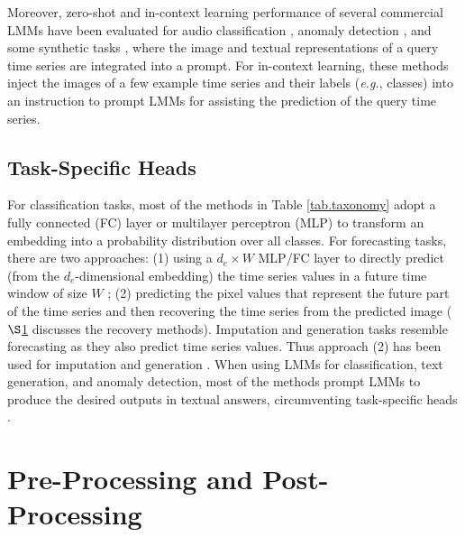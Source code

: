 Moreover, zero-shot and in-context learning performance of several commercial LMMs have been evaluated for audio classification \cite{dixit2024vision}, anomaly detection \cite{zhuang2024see}, and some synthetic tasks \cite{daswani2024plots}, where the image %
and textual representations of a query %
time series are integrated into a prompt. For in-context learning, these methods inject the images of a few example time series and their labels ({\em e.g.}, classes) %
into an instruction to prompt LMMs for assisting the prediction of the query time series.

\subsection{Task-Specific Heads}\label{sec.task}

For classification tasks, most of the methods in Table \ref{tab.taxonomy} adopt a fully connected (FC) layer or multilayer perceptron (MLP) to transform an embedding into a probability distribution over all classes. For forecasting tasks, there are two approaches: (1) using a $d_{e}\times W$ MLP/FC layer to directly predict (from the $d_{e}$-dimensional embedding) the time series values in a future time window of size $W$ \cite{li2020forecasting,semenoglou2023image}; (2) predicting the pixel values that represent the future part of the time series and then recovering the time series from the predicted image \cite{yang2023your,chen2024visionts,yang2024vitime} ($\S$\ref{sec.processing} discusses the recovery methods). Imputation and generation tasks resemble forecasting %
as they also predict time series values. Thus approach (2) has been used for imputation \cite{wang2015imaging} and generation \cite{naiman2024utilizing,karami2024timehr}. %
When using LMMs for classification, text generation, and anomaly detection, most of the methods prompt LMMs to produce the desired outputs in textual answers, circumventing task-specific heads \cite{zhang2023insight,dixit2024vision,zhuang2024see}.


\section{Pre-Processing and Post-Processing}\label{sec.processing}

